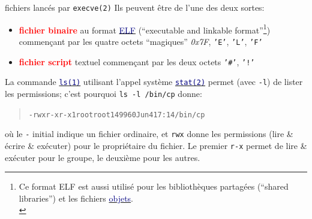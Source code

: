 \documentclass[lualatex,11pt,a4paper,svgnames,french]{beamer}
\newcommand{\clbhref}[2]{{\href{https:#1}{{\textcolor{Navy}{#2}}}}}
\newcommand{\clbman}[2]{{\href{https://man7.org/linux/man-pages/#1.html}{{\textcolor{Navy}{\texttt{#2}}}}}}
\newcommand{\clbrougras}[1]{{\textcolor{Red}{\textbf{#1}}}}
\begin{document}
\begin{frame}{fichiers lancés par \texttt{execve(2)}}
  Ils peuvent être de l'une des deux sortes:
  \begin{itemize}
  \item \clbrougras{fichier binaire} au format
    \clbhref{fr.wikipedia.org/wiki/Executable_and_Linkable_Format}{ELF}
    (``executable and linkable format''\footnote{Ce format ELF est
    aussi utilisé pour les bibliothèques partagées (``shared
    libraries'') et les fichiers 
    \clbhref{fr.wikipedia.org/wiki/Fichier_objet}{objets}.\\})
    commençant par les quatre
    octets ``magiques'' \textit{0x7F}, \texttt{'E'}, \texttt{'L'}, \texttt{'F'}
  \item \clbrougras{fichier script} textuel commençant par les deux
    octets \texttt{'\#'}, \texttt{'!'}
  \end{itemize}

  \bigskip
  
  La commande
  \clbman{man1/ls.1}{ls(1)} utilisant l'appel système
  \clbman{man2/stat.2}{stat(2)}  permet (avec \texttt{-l}) de lister les permissions; c'est pourquoi \texttt{ls -l /bin/cp} donne:
  \begin{quote}
  \begin{alltt}      
-rwxr-xr-x 1 root root 149960 Jun  4 17:14 /bin/cp
  \end{alltt}
  \end{quote}

  \smallskip
  
  \begin{relsize}{-0.5}
  où le \texttt{-} initial indique un fichier ordinaire, et
  \texttt{rwx} donne les permissions (lire \& écrire \& exécuter) pour
  le propriétaire du fichier. Le premier \texttt{r-x} permet de lire \&
  exécuter pour le groupe, le deuxième pour les autres.
  \end{relsize}
  
\end{frame}
\end{document}
